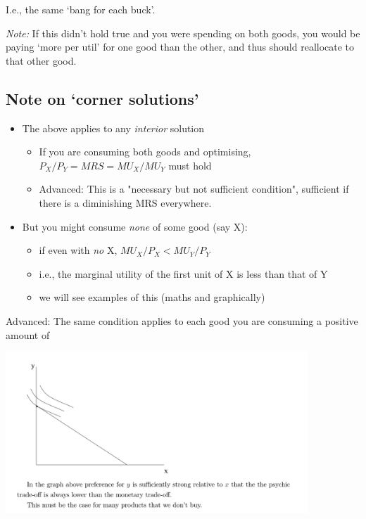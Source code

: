\documentclass[]{article}
\providecommand{\tightlist}{%
  \setlength{\itemsep}{0pt}\setlength{\parskip}{0pt}}
\begin{document}
\bigskip

I.e., the same `bang for each buck'.

\emph{Note:} If this didn't hold true and you were spending on both goods, you would be paying `more per util' for one good than the other, and thus should reallocate to that other good.

\hypertarget{note-on-corner-solutions}{%
\subsection{Note on `corner solutions'}\label{note-on-corner-solutions}}

\begin{itemize}
\tightlist
\item
  The above applies to any \emph{interior} solution

  \begin{itemize}
  \tightlist
  \item
    If you are consuming both goods and optimising, \(P_X/P_Y = MRS = MU_X/MU_Y\) must hold
  \item
    \textcolor{RawSienna}{Advanced: This is a "necessary but not sufficient condition", sufficient if there is a diminishing MRS everywhere.}
  \end{itemize}
\item
  But you might consume \emph{none} of some good (say X):

  \begin{itemize}
  \tightlist
  \item
    if even with \emph{no} X, \(MU_X/P_X<MU_Y/P_Y\)
  \item
    i.e., the marginal utility of the first unit of X is less than that of Y
  \item
    we will see examples of this (maths and graphically)
  \end{itemize}
\end{itemize}

\textcolor{RawSienna}{Advanced: The same condition applies to each good you are consuming a positive amount of }

\includegraphics[height=2.4in]{picsfigs/goodwedontbuy.png}
\end{document}
